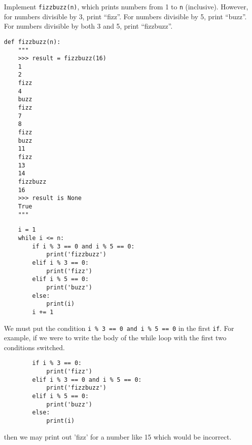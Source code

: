 \begin{blocksection}
\question Implement \lstinline$fizzbuzz(n)$, which prints numbers from 1 to \lstinline$n$
(inclusive). However, for numbers divisible by 3, print ``fizz''. For
numbers divisible by 5, print ``buzz''. For numbers divisible by both 3 and 5,
print ``fizzbuzz''.

\begin{lstlisting}
def fizzbuzz(n):
    """
    >>> result = fizzbuzz(16)
    1
    2
    fizz
    4
    buzz
    fizz
    7
    8
    fizz
    buzz
    11
    fizz
    13
    14
    fizzbuzz
    16
    >>> result is None
    True
    """
\end{lstlisting}
\begin{solution}[2in]
\begin{lstlisting}
    i = 1
    while i <= n:
        if i % 3 == 0 and i % 5 == 0:
            print('fizzbuzz')
        elif i % 3 == 0:
            print('fizz')
        elif i % 5 == 0:
            print('buzz')
        else:
            print(i)
        i += 1
\end{lstlisting}
We must put the condition \lstinline{i % 3 == 0 and i % 5 == 0} in the first \lstinline{if}. For example, if we were to write the body of the while loop with the first two conditions switched.
   \begin{lstlisting}
        if i % 3 == 0:
            print('fizz')
        elif i % 3 == 0 and i % 5 == 0:
            print('fizzbuzz')
        elif i % 5 == 0:
            print('buzz')
        else:
            print(i)
   \end{lstlisting}
   then we may print out 'fizz' for a number like 15 which would be incorrect.
\end{solution}
\end{blocksection}
